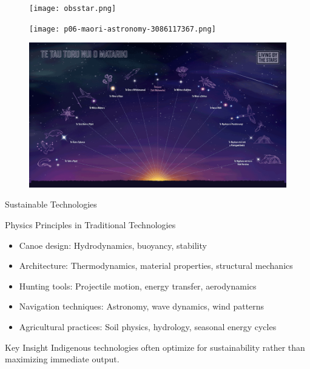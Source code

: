 \documentclass{beamer}
\begin{document}
\begin{frame}
\begin{figure}
    \centering
    \texttt{[image: obsstar.png]}
\end{figure}
\end{frame}
\begin{frame}{
}
    
\begin{figure}
    \centering
    \texttt{[image: p06-maori-astronomy-3086117367.png]}
\end{figure}
\end{frame}
\begin{frame}
\begin{figure}
    \centering
    \includegraphics[width=0.95\linewidth]{../images/cs12-place-maori_astronomy.png}
\end{figure}
\end{frame}


\begin{frame}{Sustainable Technologies}
    \begin{block}{Physics Principles in Traditional Technologies}
        \begin{itemize}
            \item Canoe design: Hydrodynamics, buoyancy, stability
            \item Architecture: Thermodynamics, material properties, structural mechanics
            \item Hunting tools: Projectile motion, energy transfer, aerodynamics
            \item Navigation techniques: Astronomy, wave dynamics, wind patterns
            \item Agricultural practices: Soil physics, hydrology, seasonal energy cycles
        \end{itemize}
    \end{block}
    
    \begin{alertblock}{Key Insight}
        Indigenous technologies often optimize for sustainability rather than maximizing immediate output.
    \end{alertblock}
\end{frame}
\end{document}
